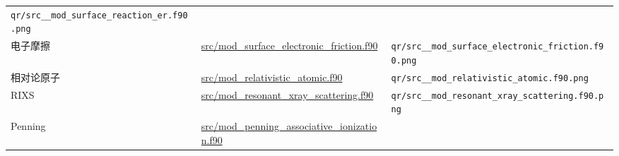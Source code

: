 \documentclass[
]{ctexbook}
\begin{document}
\begin{longtable}[]{@{}lll@{}}
\begin{minipage}[t]{0.30\columnwidth}
\texttt{qr/src\_\_mod\_surface\_reaction\_er.f90.png}\strut
\end{minipage}\tabularnewline
\begin{minipage}[t]{0.30\columnwidth}\raggedright
电子摩擦\strut
\end{minipage} & \begin{minipage}[t]{0.30\columnwidth}\raggedright
\href{https://github.com/l1Ha/QuantumGeneralModule/blob/main/src/mod_surface_electronic_friction.f90}{src/mod\_surface\_electronic\_friction.f90}\strut
\end{minipage} & \begin{minipage}[t]{0.30\columnwidth}\raggedright
\texttt{qr/src\_\_mod\_surface\_electronic\_friction.f90.png}\strut
\end{minipage}\tabularnewline
\begin{minipage}[t]{0.30\columnwidth}\raggedright
相对论原子\strut
\end{minipage} & \begin{minipage}[t]{0.30\columnwidth}\raggedright
\href{https://github.com/l1Ha/QuantumGeneralModule/blob/main/src/mod_relativistic_atomic.f90}{src/mod\_relativistic\_atomic.f90}\strut
\end{minipage} & \begin{minipage}[t]{0.30\columnwidth}\raggedright
\texttt{qr/src\_\_mod\_relativistic\_atomic.f90.png}\strut
\end{minipage}\tabularnewline
\begin{minipage}[t]{0.30\columnwidth}\raggedright
RIXS\strut
\end{minipage} & \begin{minipage}[t]{0.30\columnwidth}\raggedright
\href{https://github.com/l1Ha/QuantumGeneralModule/blob/main/src/mod_resonant_xray_scattering.f90}{src/mod\_resonant\_xray\_scattering.f90}\strut
\end{minipage} & \begin{minipage}[t]{0.30\columnwidth}\raggedright
\texttt{qr/src\_\_mod\_resonant\_xray\_scattering.f90.png}\strut
\end{minipage}\tabularnewline
\begin{minipage}[t]{0.30\columnwidth}\raggedright
Penning\strut
\end{minipage} & \begin{minipage}[t]{0.30\columnwidth}\raggedright
\href{https://github.com/l1Ha/QuantumGeneralModule/blob/main/src/mod_penning_associative_ionization.f90}{src/mod\_penning\_associative\_ionization.f90}\strut
\end{minipage} & \begin{minipage}[t]{0.30\columnwidth}\raggedright

\end{minipage}
\end{longtable}
\end{document}
